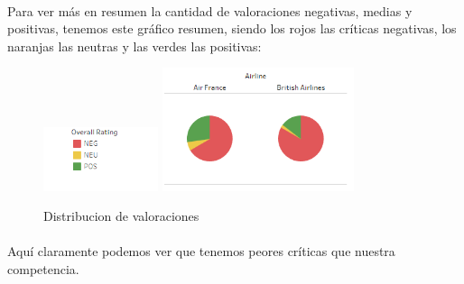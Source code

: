 \documentclass{report}
\begin{document}
            \paragraph*{}{
            Para ver más en resumen la cantidad de valoraciones negativas, medias y positivas, tenemos este gráfico resumen, siendo los rojos las críticas negativas, los naranjas las neutras y las verdes las positivas:
            }
            \begin{figure}[H]
                \centering
                \includegraphics[width=0.3\textwidth]{img/Guion2.png}
                \includegraphics[width=0.5\textwidth]{img/Quesitos.png}
                \caption{Distribucion de valoraciones}
            \end{figure}
            
            \paragraph*{}{
            Aquí claramente podemos ver que tenemos peores críticas que nuestra competencia.
            }
\end{document}
